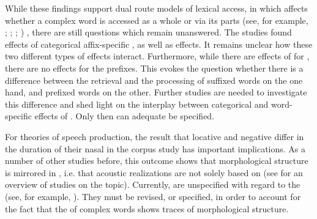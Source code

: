 While these findings support dual route models of lexical access, in which  affects whether a complex word is accessed as a whole or via its parts (see, for example, \citealt{Frauenfelder.1992}; \citealt{Schreuder.2015}; \citealt{deVaan.2011}; \citealt{Caselli.2016})
, there are still questions which remain unanswered. The studies found effects of categorical affix-specific , as well as  effects. It remains unclear how these two different types of  effects interact. Furthermore, while there are effects of  for , there are no effects for the prefixes. This evokes the question whether there is a difference between the retrieval and the processing of suffixed words on the one hand, and prefixed words on the other. Further studies are needed to investigate this difference and shed light on the interplay between categorical and word-specific effects of . Only then can adequate  be specified. 



For theories of speech production, the result that locative  and negative  differ in the duration of their nasal in the corpus study has important implications. 
As a number of other studies before, this outcome shows that morphological structure is mirrored in , i.e. that  acoustic realizations are not solely based on  (see  for an overview of studies on the topic). Currently,  are unspecified with regard to the  (see, for example, \citealt{Dell.1986,Johnson.1997b,Levelt.1999b,Bybee.2002,Pierrehumbert.2001,Pierrehumbert.2002}). They must be revised, or specified, in order to account for the fact that the  of complex words shows traces of morphological structure.

